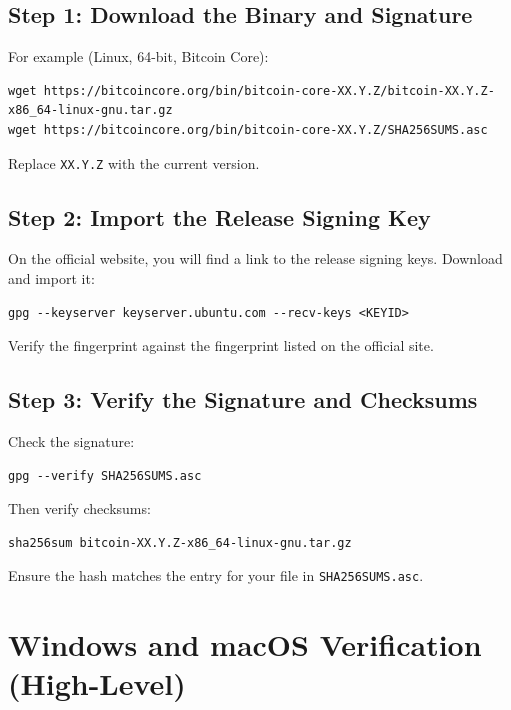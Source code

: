 \documentclass[12pt,a4paper]{book}
\begin{document}
\subsection*{Step 1: Download the Binary and Signature}

For example (Linux, 64-bit, Bitcoin Core):

\begin{lstlisting}[style=bashstyle]
wget https://bitcoincore.org/bin/bitcoin-core-XX.Y.Z/bitcoin-XX.Y.Z-x86_64-linux-gnu.tar.gz
wget https://bitcoincore.org/bin/bitcoin-core-XX.Y.Z/SHA256SUMS.asc
\end{lstlisting}

Replace \texttt{XX.Y.Z} with the current version.

\subsection*{Step 2: Import the Release Signing Key}

On the official website, you will find a link to the release signing keys. Download and import it:

\begin{lstlisting}[style=bashstyle]
gpg --keyserver keyserver.ubuntu.com --recv-keys <KEYID>
\end{lstlisting}

Verify the fingerprint against the fingerprint listed on the official site.

\subsection*{Step 3: Verify the Signature and Checksums}

Check the signature:

\begin{lstlisting}[style=bashstyle]
gpg --verify SHA256SUMS.asc
\end{lstlisting}

Then verify checksums:

\begin{lstlisting}[style=bashstyle]
sha256sum bitcoin-XX.Y.Z-x86_64-linux-gnu.tar.gz
\end{lstlisting}

Ensure the hash matches the entry for your file in \texttt{SHA256SUMS.asc}.

\section{Windows and macOS Verification (High-Level)}
\end{document}
